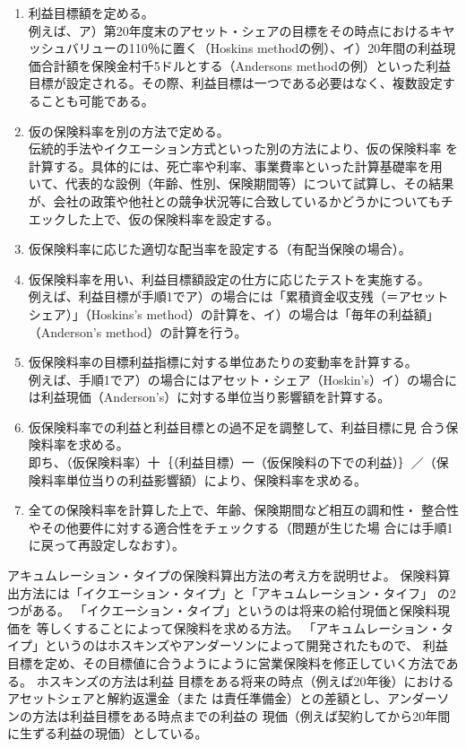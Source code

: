 \documentclass[report,gutter=10mm,fore-edge=10mm,uplatex,dvipdfmx]{jlreq}
\begin{document}
\begin{enumerate}
 \item 利益目標額を定める。\\
例えば、ア）第20年度末のアセット・シェアの目標をその時点におけるキヤッシュバリューの110％に置く（Hoskins methodの例）、イ）20年間の利益現価合計額を保険金村千5ドルとする（Andersons methodの例）といった利益目標が設定される。その際、利益目標は一つである必要はなく、複数設定することも可能である。
 \item 仮の保険料率を別の方法で定める。\\
伝統的手法やイクエーション方式といった別の方法により、仮の保険料率
を計算する。具体的には、死亡率や利率、事業費率といった計算基礎率を用
いて、代表的な設例（年齢、性別、保険期間等）について試算し、その結果
が、会社の政策や他社との競争状況等に合致しているかどうかについてもチ
エックした上で、仮の保険料率を設定する。
 \item 仮保険料率に応じた適切な配当率を設定する（有配当保険の場合）。
 \item 仮保険料率を用い、利益目標額設定の仕方に応じたテストを実施する。\\
例えば、利益目標が手順1でア）の場合には「累積資金収支残（＝アセット
シェア）」（Hoskins’s method）の計算を、イ）の場合は「毎年の利益額」
（Anderson’s method）の計算を行う。
 \item 仮保険料率の目標利益指標に対する単位あたりの変動率を計算する。\\
例えば、手順1でア）の場合にはアセット・シェア（Hoskin's）イ）の場合に
は利益現価（Anderson’s）に対する単位当り影響額を計算する。
 \item 仮保険料率での利益と利益目標との過不足を調整して、利益目標に見
合う保険料率を求める。\\
即ち、（仮保険料率）十｛（利益目標）一（仮保険料の下での利益）｝／（保
険料率単位当りの利益影響額）により、保険料率を求める。
 \item 全ての保険料率を計算した上で、年齢、保険期間など相互の調和性・
整合性やその他要件に対する適合性をチェックする（問題が生じた場
合には手順1に戻って再設定しなおす）。
\end{enumerate}

アキュムレーション・タイプの保険料算出方法の考え方を説明せよ。
保険料算出方法には「イクエーション・タイプ」と「アキュムレーション・タイフ」
の2つがある。
「イクエーション・タイプ」というのは将来の給付現価と保険料現価を
等しくすることによって保険料を求める方法。
「アキュムレーション・タイプ」というのはホスキンズやアンダーソンによって開発されたもので、
利益目標を定め、その目標値に合うようにように営業保険料を修正していく方法である。
ホスキンズの方法は利益
目標をある将来の時点（例えば20年後）におけるアセットシェアと解約返還金（また
は責任準備金）との差額とし、アンダーソンの方法は利益目標をある時点までの利益の
現価（例えば契約してから20年間に生ずる利益の現価）としている。
\end{document}
